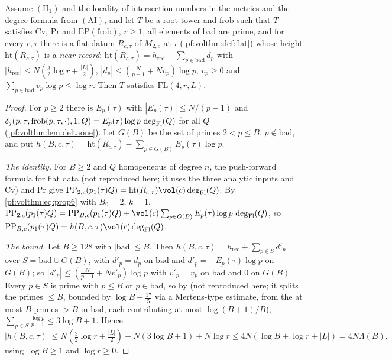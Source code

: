 \begin{proposition}\label{pf:volthm:prop:propF}
Assume $(\mathrm{H}_1)$ and the locality of intersection numbers in the metrics and the degree formula from
$(\mathrm{AI})$, and let $T$ be a root tower and $\mathrm{frob}$ such that $T$ satisfies $\mathrm{Cv}$,
$\mathrm{Pr}$ and $\mathrm{EP}(\mathrm{frob})$, $r\ge1$, all elements of $\mathrm{bad}$ are prime, and for
every $c,\tau$ there is a flat datum $R_{c,\tau}$ of $M_{2,c}$ at $\tau$ (\cref{pf:volthm:def:flat}) whose height
$\mathrm{ht}(R_{c,\tau})$ is a \emph{near record}: $\mathrm{ht}(R_{c,\tau})=h_{\mathrm{rec}}+\sum_{p\in\mathrm{bad}}d_p$ with
$|h_{\mathrm{rec}}|\le N(\frac32\log r+\frac{|L|}2)$, $|d_p|\le(\frac N{p-1}+Nv_p)\log p$, $v_p\ge0$ and
$\sum_{p\in\mathrm{bad}}v_p\log p\le\log r$. Then $T$ satisfies $\mathrm{FL}(4,r,L)$.
\end{proposition}

\begin{proof}
For $p\ge2$ there is $E_p(\tau)$ with $|E_p(\tau)|\le N/(p-1)$ and
$\delta_j(p,\tau,\mathrm{frob}(p,\tau,\cdot),1,Q)=E_p(\tau)\log p\,\deg_{\mathrm{Fl}}(Q)$ for all $Q$
(\cref{pf:volthm:lem:deltaone}). Let $G(B)$ be the set of primes $2<p\le B$, $p\notin\mathrm{bad}$, and put
$h(B,c,\tau)=\mathrm{ht}(R_{c,\tau})-\sum_{p\in G(B)}E_p(\tau)\log p$.

\emph{The identity.} For $B\ge2$ and $Q$ homogeneous of degree $n$, the push-forward formula for flat data
 (not reproduced here; it uses the three analytic inputs
and $\mathrm{Cv}$) and $\mathrm{Pr}$ give
$\volthmPP_{2,c}(p_1(\tau)Q)=\mathrm{ht}(R_{c,\tau})\vol(c)\volthmdeg(Q)$. By \eqref{pf:volthm:eq:prop6} with $B_0=2$, $k=1$,
$\volthmPP_{2,c}(p_1(\tau)Q)=\volthmPP_{B,c}(p_1(\tau)Q)+\vol(c)\sum_{p\in G(B)}E_p(\tau)\log p\,\volthmdeg(Q)$, so
$\volthmPP_{B,c}(p_1(\tau)Q)=h(B,c,\tau)\vol(c)\volthmdeg(Q)$.

\emph{The bound.} Let $B\ge128$ with $|\mathrm{bad}|\le B$. Then $h(B,c,\tau)=h_{\mathrm{rec}}+\sum_{p\in S}d'_p$ over
$S=\mathrm{bad}\cup G(B)$, with $d'_p=d_p$ on $\mathrm{bad}$ and $d'_p=-E_p(\tau)\log p$ on $G(B)$; so
$|d'_p|\le(\frac N{p-1}+Nv'_p)\log p$ with $v'_p=v_p$ on $\mathrm{bad}$ and $0$ on $G(B)$. Every $p\in S$ is prime with
$p\le B$ or $p\in\mathrm{bad}$, so by  (not reproduced
here; it splits the primes $\le B$, bounded by $\log B+\frac{17}5$ via a Mertens-type estimate, from the at most
$B$ primes $>B$ in $\mathrm{bad}$, each contributing at most $\log(B+1)/B$),
$\sum_{p\in S}\frac{\log p}{p-1}\le3\log B+1$. Hence
\[
|h(B,c,\tau)|\le N(\tfrac32\log r+\tfrac{|L|}2)+N(3\log B+1)+N\log r\le4N(\log B+\log r+|L|)=4N\Lambda(B),
\]
using $\log B\ge1$ and $\log r\ge0$.
\end{proof}

